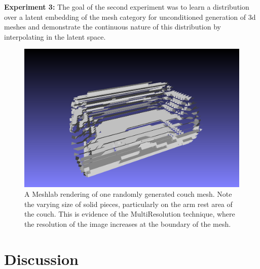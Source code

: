 \documentclass[11pt]{article}
\begin{document}
\textbf{Experiment 3:} The goal of the second experiment was to learn a distribution over a latent embedding of the mesh category for unconditioned generation of 3d meshes and demonstrate the continuous nature of this distribution by interpolating in the latent space.

\begin{figure}[h!]
  \caption{A Meshlab rendering of one randomly generated couch mesh. Note the varying size of solid pieces, particularly on the arm rest area of the couch. This is evidence of the MultiResolution technique, where the resolution of the image increases at the boundary of the mesh. }
\includegraphics[scale=0.4]{./benchImages/couch.png}
\end{figure}

\section{Discussion}
\end{document}
